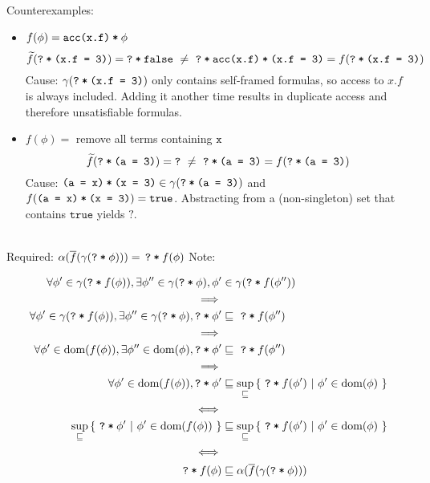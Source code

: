 \documentclass[11pt,a4paper]{article}
\newcommand{\ttt}{\texttt}
\newcommand{\edot}[2]{\ttt{#1.#2}}
\newcommand{\phiCons}[2]{\ttt{#1\:*\:#2}}
\newcommand{\phiFalse}[0]{\ttt{false}}
\newcommand{\phiTrue}[0]{\ttt{true}}
\newcommand{\phiEq}[2]{\ttt{(#1 = #2)}}
\newcommand{\phiAcc}[2]{\ttt{acc(#1.#2)}}
\newcommand{\dom}{\ensuremath{\textrm{dom}}}
\newcommand{\grad}[1]{\widetilde{#1}}
\newcommand{\qm}{\ttt{?}}
\newcommand{\withqm}[1]{\ttt{\qm\:*\:$#1$}}
\begin{document}
Counterexamples:
\begin{itemize}
\item $f(\phi) = \phiCons{\phiAcc {x} {f}}{$\phi$}$ \\
    \begin{equation*}
    \grad{f}(\withqm{\phiEq{\edot{x}{f}}{3}}) = \withqm{\phiFalse} 
    ~\neq~
    \withqm{\phiCons{\phiAcc {x} {f}} {\phiEq{\edot{x}{f}}{3}}} = f(\withqm{\phiEq{\edot{x}{f}}{3}})
    \end{equation*}
    Cause: $\gamma(\withqm{\phiEq{\edot{x}{f}}{3}})$ only contains self-framed formulas, so access to $x.f$ is always included. Adding it another time results in duplicate access and therefore unsatisfiable formulas.
\item $f(\phi) = $ remove all terms containing $\ttt{x}$ \\
    \begin{equation*}
    \grad{f}(\withqm{\phiEq{a}{3}}) = \qm 
    ~\neq~
    \withqm{\phiEq{a}{3}} = f(\withqm{\phiEq{a}{3}})
    \end{equation*}
    Cause: $\phiCons{\phiEq{a}{x}}{\phiEq{x}{3}} \in \gamma(\withqm{\phiEq{a}{3}})$ and $f(\phiCons{\phiEq{a}{x}}{\phiEq{x}{3}}) = \phiTrue$.
    Abstracting from a (non-singleton) set that contains $\phiTrue$ yields $\qm$.
\end{itemize}

~\\
Required: $\alpha(\overline{f}(\gamma(\withqm{\phi}))) =\, \withqm{f(\phi)}$
Note: 

\begin{align*}
\forall \phi' \in \gamma(\withqm{f(\phi)}), \exists \phi'' \in \gamma(\withqm{\phi}), \phi' &\in \gamma(\withqm{f(\phi'')}) \\
\implies \\
\forall \phi' \in \gamma(\withqm{f(\phi)}), \exists \phi'' \in \gamma(\withqm{\phi}), \withqm{\phi'} &\sqsubseteq \,\,\withqm{f(\phi'')} \\
\implies \\
\forall \phi' \in \dom(f(\phi)), \exists \phi'' \in \dom(\phi), \withqm{\phi'} &\sqsubseteq \,\,\withqm{f(\phi'')} \\
\implies \\
\forall \phi' \in \dom(f(\phi)), \withqm{\phi'} &\sqsubseteq \sup_{\sqsubseteq} {\{~ \withqm{f(\phi')} ~|~ \phi' \in \dom(\phi) ~\}} \\
\iff \\
\sup_{\sqsubseteq} {\{~ \withqm{\phi'} ~|~ \phi' \in \dom(f(\phi)) ~\}} &\sqsubseteq \sup_{\sqsubseteq} {\{~ \withqm{f(\phi')} ~|~ \phi' \in \dom(\phi) ~\}} \\
\iff \\
\withqm{f(\phi)}  &\sqsubseteq \alpha(\overline{f}(\gamma(\withqm{\phi})))
\end{align*}
\end{document}
